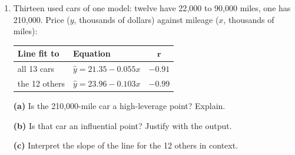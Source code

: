 \documentclass[12pt]{article}
\begin{document}
\vspace{0.06in}

\begin{enumerate}[leftmargin=1.9em, itemsep=0.10in, resume]

  \boxguard[20]
  \item \begin{minipage}[t]{0.50\linewidth}\raggedright
        Thirteen used cars of one model: twelve have 22{,}000 to 90{,}000 miles, one has
        210{,}000. Price ($y$, thousands of dollars) against mileage ($x$, thousands of miles):
        \end{minipage}\hfill
        \begin{minipage}[t]{0.46\linewidth}\vspace{0pt}\centering\small
        \setlength{\tabcolsep}{4pt}%
        \renewcommand{\arraystretch}{1.1}
        \begin{tabular}{@{} l l c @{}}
        \rowcolor{sky}
        \textbf{Line fit to} & \textbf{Equation} & $\boldsymbol{r}$ \\
        \hline
        all 13 cars & $\hat{y} = 21.35 - 0.055x$ & $-0.91$ \\
        the 12 others & $\hat{y} = 23.96 - 0.103x$ & $-0.99$ \\
        \end{tabular}
        \end{minipage}

        \vspace{6pt}

        \boxguard[14]
        \textbf{(a)} Is the 210{,}000-mile car a high-leverage point? Explain.\\[4pt]

        \vspace{4pt}
        \boxguard[14]
        \textbf{(b)} Is that car an influential point? Justify with the output.\\[4pt]

        \vspace{4pt}
        \boxguard[14]
        \textbf{(c)} Interpret the slope of the line for the 12 others in context.\\[4pt]

\end{enumerate}
\end{document}
